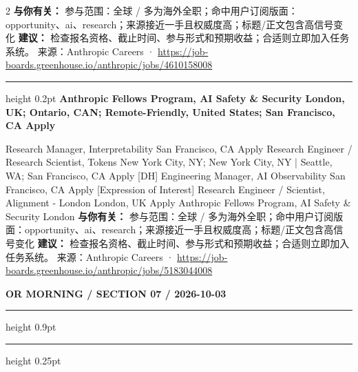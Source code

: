 \documentclass[10.5pt]{ctexart}
\begin{document}
\begin{multicols}{2}
\textbf{与你有关：} 参与范围：全球 / 多为海外全职；命中用户订阅版面：opportunity、ai、research；来源接近一手且权威度高；标题/正文包含高信号变化
\textbf{建议：} 检查报名资格、截止时间、参与形式和预期收益；合适则立即加入任务系统。
{\footnotesize\color{ormuted} 来源：Anthropic Careers · \url{https://job-boards.greenhouse.io/anthropic/jobs/4610158008}}
\vspace{2mm}
\hrule height 0.2pt
\vspace{2mm}
{\large\bfseries Anthropic Fellows Program, AI Safety \& Security London, UK; Ontario, CAN; Remote-Friendly, United States; San Francisco, CA Apply}\par
[Expression of Interest] Research Manager, Interpretability San Francisco, CA Apply Research Engineer / Research Scientist, Tokens New York City, NY; New York City, NY | Seattle, WA; San Francisco, CA Apply [DH] Engineering Manager, AI Observability San Francisco, CA Apply [Expression of Interest] Research Engineer / Scientist, Alignment - London London, UK Apply Anthropic Fellows Program, AI Safety \& Security London
\textbf{与你有关：} 参与范围：全球 / 多为海外全职；命中用户订阅版面：opportunity、ai、research；来源接近一手且权威度高；标题/正文包含高信号变化
\textbf{建议：} 检查报名资格、截止时间、参与形式和预期收益；合适则立即加入任务系统。
{\footnotesize\color{ormuted} 来源：Anthropic Careers · \url{https://job-boards.greenhouse.io/anthropic/jobs/5183044008}}
\end{multicols}
\newpage
{\small\bfseries OR MORNING / SECTION 07 / 2026-10-03}
\vspace{2mm}
\hrule height 0.9pt
\vspace{1.5mm}
\hrule height 0.25pt
\vspace{4mm}
\end{document}
